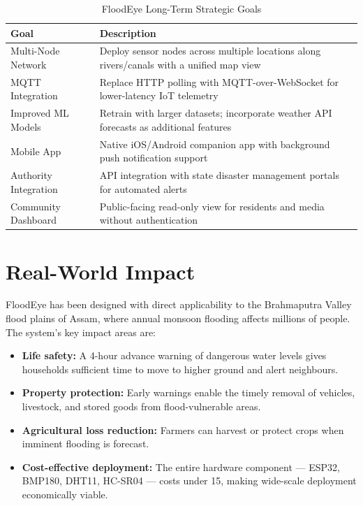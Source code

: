 \begin{table}[H]
\centering
\caption{FloodEye Long-Term Strategic Goals}
\begin{tabularx}{\linewidth}{|l|X|}
\hline
\rowcolor{FloodLight}
\textbf{Goal} & \textbf{Description} \\
\hline
Multi-Node Network & Deploy sensor nodes across multiple locations along rivers/canals with a unified map view \\
\hline
MQTT Integration & Replace HTTP polling with MQTT-over-WebSocket for lower-latency IoT telemetry \\
\hline
Improved ML Models & Retrain with larger datasets; incorporate weather API forecasts as additional features \\
\hline
Mobile App & Native iOS/Android companion app with background push notification support \\
\hline
Authority Integration & API integration with state disaster management portals for automated alerts \\
\hline
Community Dashboard & Public-facing read-only view for residents and media without authentication \\
\hline
\end{tabularx}
\end{table}

\section{Real-World Impact}

FloodEye has been designed with direct applicability to the Brahmaputra Valley flood plains of Assam, where annual monsoon flooding affects millions of people. The system's key impact areas are:

\begin{itemize}[leftmargin=1.5em]
  \item \textbf{Life safety:} A 4-hour advance warning of dangerous water levels gives households sufficient time to move to higher ground and alert neighbours.
  \item \textbf{Property protection:} Early warnings enable the timely removal of vehicles, livestock, and stored goods from flood-vulnerable areas.
  \item \textbf{Agricultural loss reduction:} Farmers can harvest or protect crops when imminent flooding is forecast.
  \item \textbf{Cost-effective deployment:} The entire hardware component — ESP32, BMP180, DHT11, HC-SR04 — costs under \texteuro{}15, making wide-scale deployment economically viable.
\end{itemize}

